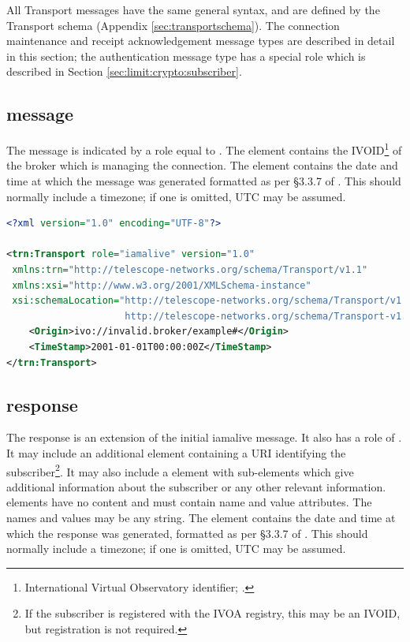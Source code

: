 \documentclass[a4paper,11pt]{ivoa}
\begin{document}
All Transport messages have the same general syntax, and are defined by the
Transport schema (Appendix \ref{sec:transportschema}). The connection
maintenance and receipt acknowledgement message types are described in detail
in this section; the authentication message type has a special role which is
described in Section \ref{sec:limit:crypto:subscriber}.

\subsection{ message}
\label{sec:transport:iamalive}

The  message is indicated by a role equal to .
The  element contains the IVOID\footnote{International
Virtual Observatory identifier; \citet{std:VOID2}.} of the broker which is
managing the connection. The  element contains the date
and time at which the message was generated formatted as per \S3.3.7 of
\citet{Peterson:2012}. This should normally include a timezone; if one is
omitted, UTC may be assumed.

\begin{lstlisting}[language=xml,caption=Sample \xmlel{iamalive} message.,
                   label=lst:iamalive]
<?xml version="1.0" encoding="UTF-8"?>

<trn:Transport role="iamalive" version="1.0"
 xmlns:trn="http://telescope-networks.org/schema/Transport/v1.1"
 xmlns:xsi="http://www.w3.org/2001/XMLSchema-instance"
 xsi:schemaLocation="http://telescope-networks.org/schema/Transport/v1.1
                     http://telescope-networks.org/schema/Transport-v1.1.xsd">
    <Origin>ivo://invalid.broker/example#</Origin>
    <TimeStamp>2001-01-01T00:00:00Z</TimeStamp>
</trn:Transport>
\end{lstlisting}

\subsection{ response}
\label{sec:transport:iamaliveresponse}

The  response is an extension of the initial iamalive message.
It also has a role of . It may include an additional
 element containing a URI identifying the
subscriber\footnote{If the subscriber is registered with the IVOA registry,
this may be an IVOID, but registration is not required.}. It may also include
a  element with  sub-elements which give
additional information about the subscriber or any other relevant information.
 elements have no content and must contain name and value
attributes. The names and values may be any string. The 
element contains the date and time at which the response was generated,
formatted as per \S3.3.7 of \citet{Peterson:2012}. This should normally
include a timezone; if one is omitted, UTC may be assumed.
\end{document}
